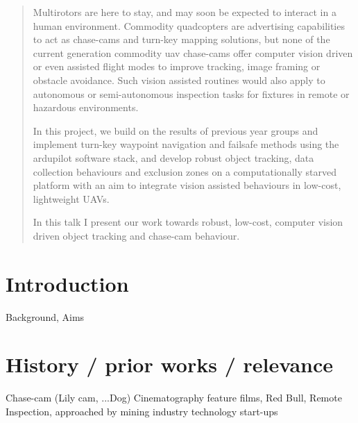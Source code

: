\documentclass[a4paper, 11pt, titlepage]{article}
\begin{document}
  

  \begin{abstract}
Multirotors are here to stay, and may soon be expected to interact in a human environment.
Commodity quadcopters are advertising capabilities to act as  chase-cams and turn-key mapping solutions, but none of the current generation commodity uav chase-cams offer computer vision driven or even assisted flight modes to improve tracking, image framing or obstacle avoidance.  Such vision assisted routines would also apply to autonomous or semi-autonomous inspection tasks for fixtures in remote or hazardous environments.

In this project, we build on the results of previous year groups and implement turn-key waypoint navigation and failsafe methods using the ardupilot software stack, and develop robust object tracking, data collection behaviours and exclusion zones on a computationally starved platform with an aim to integrate vision assisted behaviours in low-cost, lightweight UAVs.

In this talk I present our work towards robust, low-cost, computer vision driven object tracking and chase-cam behaviour.


  \end{abstract}

  \tableofcontents
  \pagebreak
  \section{Introduction}
	Background, Aims



\section{History / prior works / relevance}
	Chase-cam (Lily cam, ...Dog)
	Cinematography	feature films, Red Bull, 
	Remote Inspection, approached by mining industry technology start-ups
\end{document}
